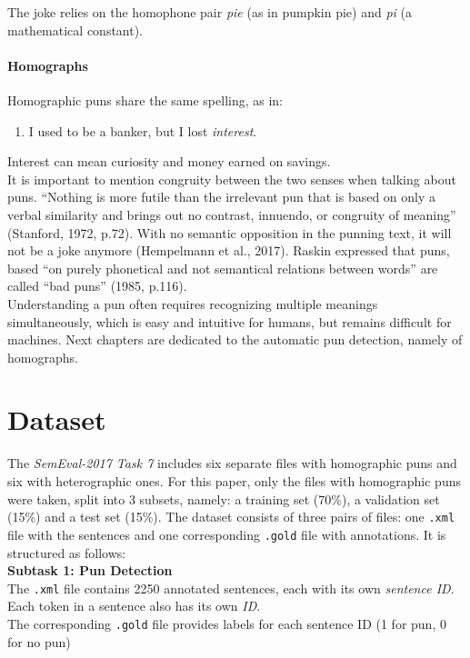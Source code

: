 \documentclass[10pt]{article}
\begin{document}
The joke relies on the homophone pair \textit{pie} (as in pumpkin pie) and \textit{pi} (a mathematical constant). 

\paragraph{Homographs} Homographic puns share the same spelling, as in:

\begin{enumerate}
    \item I used to be a banker, but I lost \textit{interest}.
\end{enumerate}
Interest can mean curiosity and money earned on savings.\\[15pt]
It is important to mention congruity between the two senses when talking about puns. “Nothing is more futile than the irrelevant pun that is based on only a verbal similarity and brings out no contrast, innuendo, or congruity of meaning” (Stanford, 1972, p.72). With no semantic opposition in the punning text, it will not be a joke anymore (Hempelmann et al., 2017). Raskin expressed that puns, based “on purely phonetical and not semantical relations between words” are called “bad puns” (1985, p.116). \\[6pt]
Understanding a pun often requires recognizing multiple meanings simultaneously, which is easy and intuitive for humans, but remains difficult for machines. Next chapters are dedicated to the automatic pun detection, namely of homographs. 

\section{Dataset}
The \textit{SemEval-2017 Task 7} includes six separate files with homographic puns and six with heterographic ones. For this paper, only the files with homographic puns were taken, split into 3 subsets, namely: a training set (70\%), a validation set (15\%) and a test set (15\%). The dataset consists of three pairs of files: one  \texttt{.xml} file with the sentences and one corresponding  \texttt{.gold} file with annotations. It is structured as follows:\\[6pt]

\textbf{Subtask 1: Pun Detection} \\[6pt]
The \texttt{.xml} file contains 2250 annotated sentences, each with its own \textit{sentence ID}.\\[6pt]  
Each token in a sentence also has its own \textit{ID}.\\[6pt]
The corresponding \texttt{.gold} file provides labels for each sentence ID (1 for pun, 0 for no pun)\\[6pt]
\end{document}
